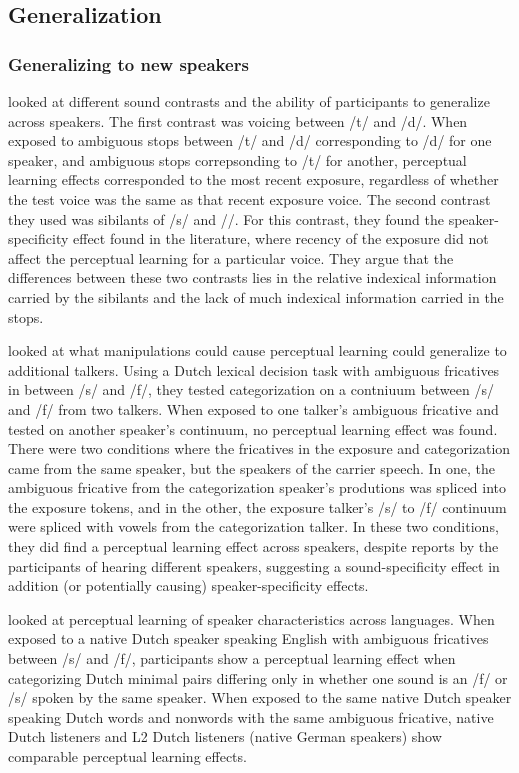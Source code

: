 \documentclass[11pt]{article} %
\begin{document}
\subsection{Generalization}

\subsubsection{Generalizing to new speakers}

\citet{Kraljic2007} looked at different sound contrasts and the ability of participants to generalize across speakers.  
The first contrast was voicing between /t/ and /d/.  
When exposed to ambiguous stops between /t/ and /d/ corresponding to /d/ for one speaker, and ambiguous stops correpsonding to /t/ for another, perceptual learning effects corresponded to the most recent exposure, regardless of whether the test voice was the same as that recent exposure voice.  
The second contrast they used was sibilants of /s/ and /\textesh/. 
 For this contrast, they found the speaker-specificity effect found in the literature, where recency of the exposure did not affect the perceptual learning for a particular voice.  They argue that the differences between these two contrasts lies in the relative indexical information carried by the sibilants and the lack of much indexical information carried in the stops.

\citet{Eisner2005} looked at what manipulations could cause perceptual learning could generalize to additional talkers.  
Using a Dutch lexical decision task with ambiguous fricatives in between /s/ and /f/, they tested categorization on a contniuum between /s/ and /f/ from two talkers.  
When exposed to one talker's ambiguous fricative and tested on another speaker's continuum, no perceptual learning effect was found.  
There were two conditions where the fricatives in the exposure and categorization came from the same speaker, but the speakers of the carrier speech.  
In one, the ambiguous fricative from the categorization speaker's produtions was spliced into the exposure tokens, and in the other, the exposure talker's /s/ to /f/ continuum were spliced with vowels from the categorization talker.
In these two conditions, they did find a perceptual learning effect across speakers, despite reports by the participants of hearing different speakers, suggesting a sound-specificity effect in addition (or potentially causing) speaker-specificity effects. 

\citet{Reinisch2013} looked at perceptual learning of speaker characteristics across languages.  
When exposed to a native Dutch speaker speaking English with ambiguous fricatives between /s/ and /f/, participants show a perceptual learning effect when categorizing Dutch minimal pairs differing only in whether one sound is an /f/ or /s/ spoken by the same speaker.  
When exposed to the same native Dutch speaker speaking Dutch words and nonwords with the same ambiguous fricative, native Dutch listeners and L2 Dutch listeners (native German speakers) show comparable perceptual learning effects.
\end{document}
